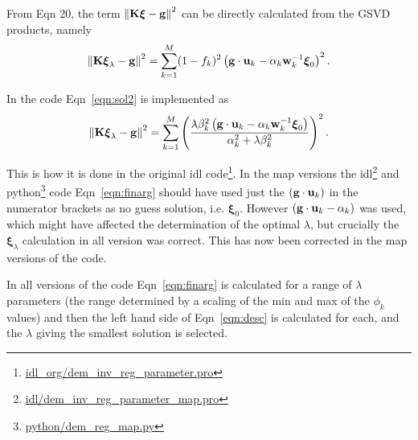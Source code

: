 \documentclass[12pt,a4paper]{article}
\begin{document}
From \citet{1992InvPr...8..849H} Eqn 20, the term $\left\|\bf{K\boldsymbol{\xi}-g}\right\|^2$ can be directly calculated from the GSVD products, namely
\begin{equation}\label{eqn:sol2}
\left\|\bf{K\boldsymbol{\xi}_\lambda-g}\right\|^2=\sum_{k=1}^ M (1-f_k)^2\left(
{\bf g}\cdot {\bf u}_k - \alpha_k{\bf w}_k^{-1}\boldsymbol{\xi}_0
\right)^2.
\end{equation}

In the code Eqn~\ref{eqn:sol2} is implemented as
\begin{equation}\label{eqn:finarg}
    \left\|\bf{K\boldsymbol{\xi}_\lambda-g}\right\|^2=\sum_{k=1}^ M \left(\frac{\lambda\beta_k^2\left({\bf g}\cdot {\bf u}_k-\alpha_k{\bf w}_k^{-1}\boldsymbol{\xi}_0\right)}{\alpha_k^2 + \lambda\beta_k^2}\right)^2.
\end{equation}

This is how it is done in the original idl code\footnote{\href{https://github.com/ianan/demreg/blob/master/idl_org/dem_inv_reg_parameter.pro}{idl\_org/dem\_inv\_reg\_parameter.pro}}. In the map versions the idl\footnote{\href{https://github.com/ianan/demreg/blob/master/idl/dem_inv_reg_parameter_map.pro}{idl/dem\_inv\_reg\_parameter\_map.pro}} and python\footnote{\href{https://github.com/ianan/demreg/blob/master/python/dem_reg_map.py}{python/dem\_reg\_map.py}} code Eqn~\ref{eqn:finarg} should have used just the $\left({\bf g}\cdot {\bf u}_k\right)$ in the numerator brackets as no guess solution, i.e. $\boldsymbol{\xi}_0$. However $\left({\bf g}\cdot {\bf u}_k-\alpha_k\right)$ was used, which might have affected the determination of the optimal $\lambda$, but crucially the $\boldsymbol{\xi}_\lambda$ calculation in all version was correct. This has now been corrected in the map versions of the code.

In all versions of the code Eqn~\ref{eqn:finarg} is calculated for a range of $\lambda$ parameters (the range determined by a scaling of the min and max of the $\phi_k$ values) and then the left hand side of Eqn~\ref{eqn:desc} is calculated for each, and the $\lambda$ giving the smallest solution is selected.
\end{document}
